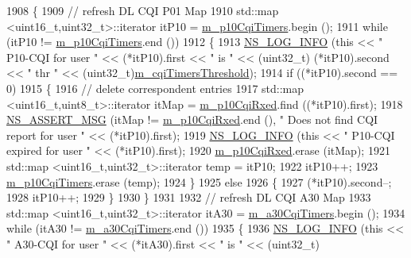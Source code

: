 \begin{DoxyCode}
1908 \{
1909   \textcolor{comment}{// refresh DL CQI P01 Map}
1910   std::map <uint16\_t,uint32\_t>::iterator itP10 = \hyperlink{classns3_1_1TdMtFfMacScheduler_a6c94a7bc6c5718afd7c7cf8dbd1ed8e5}{m\_p10CqiTimers}.begin ();
1911   \textcolor{keywordflow}{while} (itP10 != \hyperlink{classns3_1_1TdMtFfMacScheduler_a6c94a7bc6c5718afd7c7cf8dbd1ed8e5}{m\_p10CqiTimers}.end ())
1912     \{
1913       \hyperlink{group__logging_gafbd73ee2cf9f26b319f49086d8e860fb}{NS\_LOG\_INFO} (\textcolor{keyword}{this} << \textcolor{stringliteral}{" P10-CQI for user "} << (*itP10).first << \textcolor{stringliteral}{" is "} << (uint32\_t)
      (*itP10).second << \textcolor{stringliteral}{" thr "} << (uint32\_t)\hyperlink{classns3_1_1TdMtFfMacScheduler_a63ad2273332391bf152913fe2dbfa186}{m\_cqiTimersThreshold});
1914       \textcolor{keywordflow}{if} ((*itP10).second == 0)
1915         \{
1916           \textcolor{comment}{// delete correspondent entries}
1917           std::map <uint16\_t,uint8\_t>::iterator itMap = \hyperlink{classns3_1_1TdMtFfMacScheduler_a4b524ffee6b93f0534a603937fd30cb1}{m\_p10CqiRxed}.find ((*itP10).first);
1918           \hyperlink{assert_8h_aff5ece9066c74e681e74999856f08539}{NS\_ASSERT\_MSG} (itMap != \hyperlink{classns3_1_1TdMtFfMacScheduler_a4b524ffee6b93f0534a603937fd30cb1}{m\_p10CqiRxed}.end (), \textcolor{stringliteral}{" Does not find CQI report
       for user "} << (*itP10).first);
1919           \hyperlink{group__logging_gafbd73ee2cf9f26b319f49086d8e860fb}{NS\_LOG\_INFO} (\textcolor{keyword}{this} << \textcolor{stringliteral}{" P10-CQI expired for user "} << (*itP10).first);
1920           \hyperlink{classns3_1_1TdMtFfMacScheduler_a4b524ffee6b93f0534a603937fd30cb1}{m\_p10CqiRxed}.erase (itMap);
1921           std::map <uint16\_t,uint32\_t>::iterator temp = itP10;
1922           itP10++;
1923           \hyperlink{classns3_1_1TdMtFfMacScheduler_a6c94a7bc6c5718afd7c7cf8dbd1ed8e5}{m\_p10CqiTimers}.erase (temp);
1924         \}
1925       \textcolor{keywordflow}{else}
1926         \{
1927           (*itP10).second--;
1928           itP10++;
1929         \}
1930     \}
1931 
1932   \textcolor{comment}{// refresh DL CQI A30 Map}
1933   std::map <uint16\_t,uint32\_t>::iterator itA30 = \hyperlink{classns3_1_1TdMtFfMacScheduler_ad812aff03ccff65b09c8d25912522994}{m\_a30CqiTimers}.begin ();
1934   \textcolor{keywordflow}{while} (itA30 != \hyperlink{classns3_1_1TdMtFfMacScheduler_ad812aff03ccff65b09c8d25912522994}{m\_a30CqiTimers}.end ())
1935     \{
1936       \hyperlink{group__logging_gafbd73ee2cf9f26b319f49086d8e860fb}{NS\_LOG\_INFO} (\textcolor{keyword}{this} << \textcolor{stringliteral}{" A30-CQI for user "} << (*itA30).first << \textcolor{stringliteral}{" is "} << (uint32\_t)

\end{DoxyCode}
